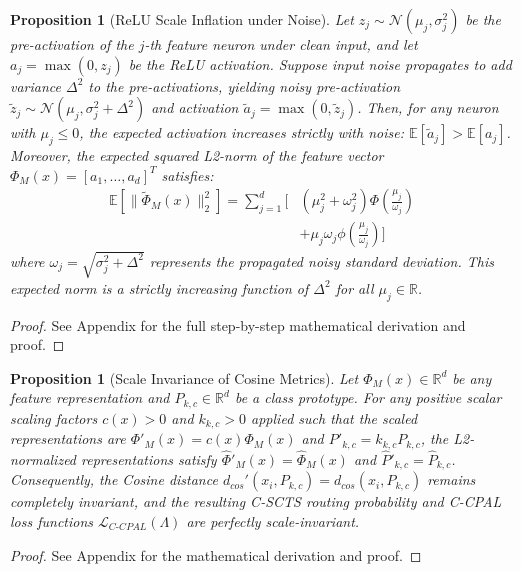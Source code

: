 \documentclass{article}
\theoremstyle{plain}
\newtheorem{proposition}[theorem]{Proposition}
\theoremstyle{definition}
\theoremstyle{remark}
\begin{document}
\begin{proposition}[ReLU Scale Inflation under Noise]
\label{prop:relu_inflation}
Let $z_j \sim \mathcal{N}(\mu_j, \sigma_j^2)$ be the pre-activation of the $j$-th feature neuron under clean input, and let $a_j = \max(0, z_j)$ be the ReLU activation. Suppose input noise propagates to add variance $\Delta^2$ to the pre-activations, yielding noisy pre-activation $\tilde{z}_j \sim \mathcal{N}(\mu_j, \sigma_j^2 + \Delta^2)$ and activation $\tilde{a}_j = \max(0, \tilde{z}_j)$. Then, for any neuron with $\mu_j \le 0$, the expected activation increases strictly with noise: $\mathbb{E}[\tilde{a}_j] > \mathbb{E}[a_j]$.
Moreover, the expected squared L2-norm of the feature vector $\Phi_M(x) = [a_1, \dots, a_d]^T$ satisfies:
\begin{align}
\mathbb{E}[\|\tilde{\Phi}_M(x)\|_2^2] = \sum_{j=1}^d \bigg[ &(\mu_j^2 + \omega_j^2)\Phi\left(\frac{\mu_j}{\omega_j}\right) \nonumber \\
&+ \mu_j \omega_j \phi\left(\frac{\mu_j}{\omega_j}\right) \bigg]
\end{align}
where $\omega_j = \sqrt{\sigma_j^2 + \Delta^2}$ represents the propagated noisy standard deviation. This expected norm is a strictly increasing function of $\Delta^2$ for all $\mu_j \in \mathbb{R}$.
\end{proposition}
\begin{proof}
See Appendix for the full step-by-step mathematical derivation and proof.
\end{proof}

\begin{proposition}[Scale Invariance of Cosine Metrics]
\label{prop:cosine_invariance}
Let $\Phi_{M}(x) \in \mathbb{R}^d$ be any feature representation and $P_{k,c} \in \mathbb{R}^d$ be a class prototype. For any positive scalar scaling factors $c(x) > 0$ and $k_{k,c} > 0$ applied such that the scaled representations are $\Phi'_{M}(x) = c(x)\Phi_{M}(x)$ and $P'_{k,c} = k_{k,c} P_{k,c}$, the L2-normalized representations satisfy $\hat{\Phi}'_{M}(x) = \hat{\Phi}_{M}(x)$ and $\hat{P}'_{k,c} = \hat{P}_{k,c}$. Consequently, the Cosine distance $d_{cos}'(x_i, P_{k,c}) = d_{cos}(x_i, P_{k,c})$ remains completely invariant, and the resulting C-SCTS routing probability and C-CPAL loss functions $\mathcal{L}_{C\text{-}CPAL}(\Lambda)$ are perfectly scale-invariant.
\end{proposition}
\begin{proof}
See Appendix for the mathematical derivation and proof.
\end{proof}
\end{document}
